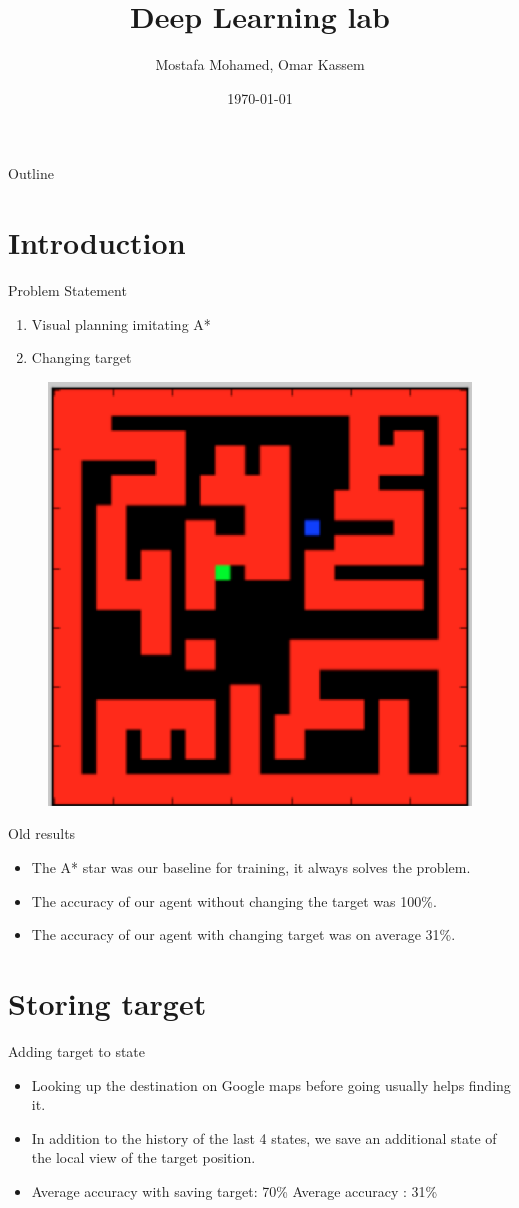 \documentclass{beamer}
\title[]{Deep Learning lab}
\subtitle{}
\author[Uni-Freiburg]{Mostafa Mohamed, Omar Kassem}
\date{\today}
\institute{Alberts-Ludwig Universt\"at Freiburg}
\begin{document}
\begin{frame}
\titlepage
\end{frame}

\begin{frame}{Outline}
  \setcounter{tocdepth}{1}
  \tableofcontents
\end{frame}

\section{Introduction}
\begin{frame}{Problem Statement}
\begin{enumerate}
\item Visual planning imitating A*
\item Changing target
\end{enumerate}
\begin{figure}
        \includegraphics[width=0.30\linewidth]{problem.png}
    \label{fig1}
\end{figure}
\end{frame}

\begin{frame}{Old results}
\begin{itemize}
    \item The A* star was our baseline for training, it always solves the problem.
    \item The accuracy of our agent without changing the target was 100\%.
    \item The accuracy of our agent with changing target was on average 31\%.
\end{itemize}
\end{frame}

\section{Storing target}
\begin{frame}{Adding target to state}
\begin{itemize}
\item Looking up the destination on Google maps before going usually helps finding it.
\item In addition to the history of the last 4 states, we save an additional state of the local view of the target position.
\item Average accuracy with saving target: 70\% Average accuracy : 31\%
\end{itemize}
\end{frame}
\end{document}
